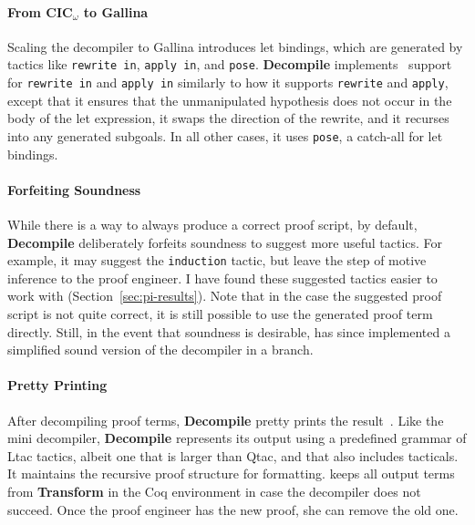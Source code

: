 \paragraph{From CIC$_{\omega}$ to Gallina}
Scaling the decompiler to Gallina introduces let bindings, which are generated by 
tactics like \lstinline{rewrite in}, \lstinline{apply in}, and \lstinline{pose}.
\textbf{Decompile} implements~\href{https://github.com/uwplse/coq-plugin-lib/blob/9ef05815c261de9c99b604c6b581ba1c4fbc1a46/src/coq/decompiler/decompiler.ml}{} %
support for \lstinline{rewrite in} and \lstinline{apply in} similarly to how it supports
\lstinline{rewrite} and \lstinline{apply}, except that it ensures that the unmanipulated hypothesis does not occur in the body of the let expression,
it swaps the direction of the rewrite, and it recurses into any generated subgoals.
In all other cases, it uses \lstinline{pose}, a catch-all for let bindings.

\paragraph{Forfeiting Soundness}
While there is a way to always produce a correct proof script,
by default, \textbf{Decompile} deliberately forfeits soundness to suggest more useful tactics.
For example, it may suggest the \lstinline{induction} tactic, but leave the step of motive inference to the proof engineer.
I have found these suggested tactics easier to work with (Section~\ref{sec:pi-results}).
Note that in the case the suggested proof script is not quite correct,
it is still possible to use the generated proof term directly.
Still, in the event that soundness is desirable,  has since implemented a simplified sound
version of the decompiler in a branch. %

\paragraph{Pretty Printing}
After decompiling proof terms, \textbf{Decompile} pretty prints the result~\href{https://github.com/uwplse/coq-plugin-lib/blob/9ef05815c261de9c99b604c6b581ba1c4fbc1a46/src/coq/decompiler/decompiler.ml}{}.
Like the mini decompiler, \textbf{Decompile} represents its output using a predefined grammar of Ltac tactics,
albeit one that is larger than Qtac, and that also includes tacticals.
It maintains the recursive proof structure for formatting. %
\toolnamec keeps all output terms from \textbf{Transform} in the Coq environment in case the decompiler does not succeed.
Once the proof engineer has the new proof, she can remove the old one.

